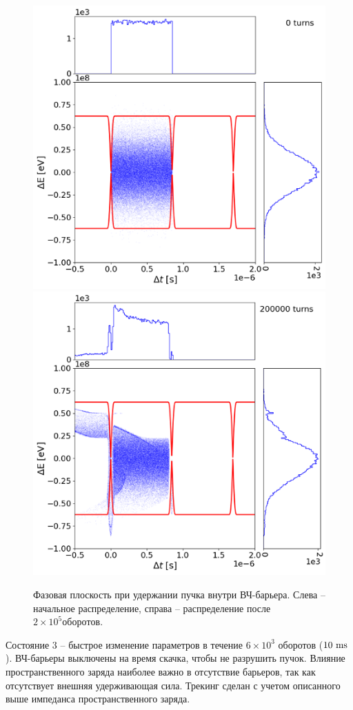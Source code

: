 \documentclass[a4paper]{panl}
\begin{document}
\begin{figure}
   \includegraphics*[width=.49\columnwidth]{img/fig_08-1}
   \includegraphics*[width=.49\columnwidth]{img/fig_08-2}
   \caption{Фазовая плоскость при удержании пучка внутри ВЧ-барьера. Слева – начальное распределение, справа – распределение после $2\times{10}^5 оборотов$.}
   \label{fig:2}
\end{figure}

\par Состояние 3 – быстрое изменение параметров в течение $6\times{10}^3$ о\-бо\-ро\-тов ($10~\rm{ ms}$). ВЧ-барьеры выключены на время скачка, чтобы не разрушить пучок. Влияние пространственного заряда наиболее важно в отсутствие барь\-е\-ров, так как отсутствует внешняя удерживающая сила. Трекинг сделан с учетом описанного выше импеданса пространственного заряда.
\end{document}
